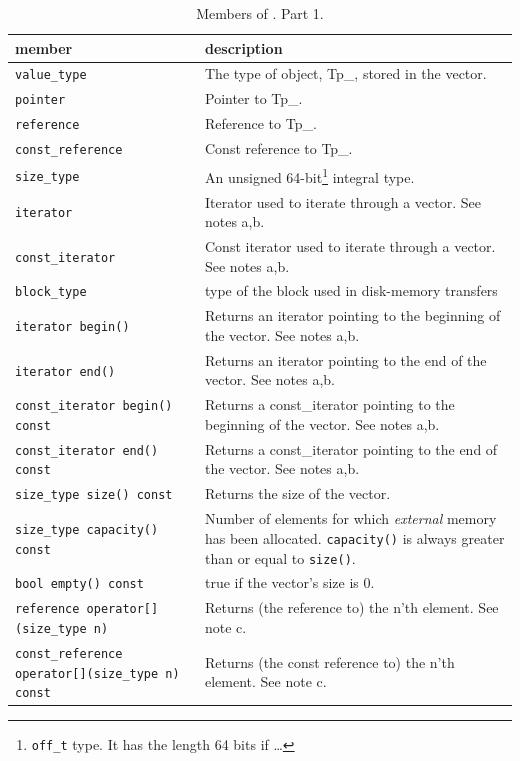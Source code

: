 \documentclass[twoside]{book}
\begin{document}
\begin{table}[h]
\begin{center}
\caption{Members of \xvector. Part 1.}
\label{vectormembers1}
\begin{tabular}{|p{6cm}|p{5cm}|}
\hline
member & description  \\
\hline\hline
\texttt{value\_type} &  The type of object, Tp\_, stored in the vector. \\
\hline
\texttt{pointer} & Pointer to Tp\_. \\
\hline
\texttt{reference} & Reference to Tp\_. \\
\hline
\texttt{const\_reference} & Const reference to Tp\_. \\
\hline
\texttt{size\_type} & An unsigned 64-bit\footnote{\texttt{off\_t}
type. It has the length 64 bits if \ldots} integral type. \\
\hline
\texttt{iterator} & Iterator used to iterate through a vector. See
notes a,b. \\
\hline
\texttt{const\_iterator} & Const iterator used to iterate through a
vector. See notes a,b. \\
\hline
\texttt{block\_type} & type of the block used in disk-memory 
transfers \\
\hline
\texttt{iterator begin()} & Returns an iterator pointing to the
beginning of the vector. See notes a,b. \\
\hline
\texttt{iterator end()} & Returns an iterator pointing to the end of
the vector. See notes a,b.\\
\hline
\texttt{const\_iterator begin() const} & Returns a const\_iterator
pointing to the beginning of the vector. See notes a,b.\\ 
\hline
\texttt{const\_iterator end() const} & Returns a const\_iterator
pointing to the end of the vector. See notes a,b. \\
\hline
\texttt{size\_type size() const} & Returns the size of the vector. \\
\hline
\texttt{size\_type capacity() const} & Number of elements for which
\emph{external} memory has been allocated. \texttt{capacity()} is always
greater than or equal to \texttt{size()}. \\
\hline
\texttt{bool empty() const} & true if the vector's size is 0.\\
\hline
\texttt{reference operator[](size\_type n)} & Returns (the reference to)
the n'th element. See note c.\\ 
\hline
\texttt{const\_reference operator[](size\_type n) const} & Returns
(the const reference to)
the n'th element. See note c.\\ 
\hline
\end{tabular}
\end{center}
\end{table}
\end{document}
